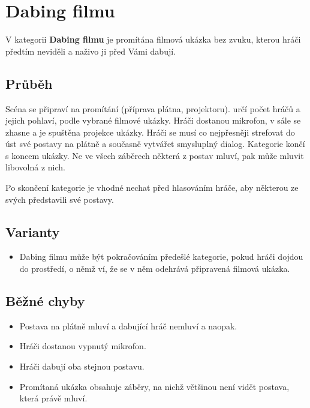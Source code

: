  
 
 
 
\needspace{5cm} \section{Dabing filmu} \label{dabing filmu}  
 
V kategorii \textbf{Dabing filmu}{} je promítána filmová ukázka bez zvuku, kterou hráči předtím neviděli a naživo ji před Vámi dabují. 
 
\subsection{ Průběh } Scéna se připraví na promítání (příprava plátna, projektoru).  určí počet hráčů a jejich pohlaví, podle vybrané filmové ukázky. Hráči dostanou mikrofon, v sále se zhasne a je spuštěna projekce ukázky. Hráči se musí co nejpřesněji strefovat do úst své postavy na plátně a současně vytvářet smysluplný dialog. Kategorie končí s koncem ukázky. Ne ve všech záběrech některá z postav mluví, pak může mluvit libovolná z nich. 
 
Po skončení kategorie je vhodné nechat před hlasováním hráče, aby některou ze svých  představili své postavy. 
 
\subsection{ Varianty } \begin{itemize}
\item Dabing filmu může být pokračováním předešlé kategorie, pokud hráči dojdou do prostředí, o němž  ví, že se v něm odehrává připravená filmová ukázka.
\end{itemize}
 
\subsection{ Běžné chyby } \begin{itemize}
\item Postava na plátně mluví a dabující hráč nemluví a naopak.
\item Hráči dostanou vypnutý mikrofon.
\item Hráči dabují oba stejnou postavu.
\item Promítaná ukázka obsahuje záběry, na nichž většinou není vidět postava, která právě mluví.
\end{itemize}
 
